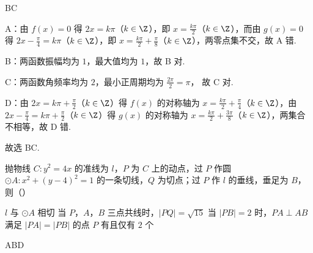 \begin{answer}
BC
\end{answer}

\begin{solution}
A：由 \(f(x)=0\) 得 \(2x=k\pi\)（\(k\in\Z\)），即 \(x=\frac{k\pi}{2}\)（\(k\in\Z\)），而由 \(g(x)=0\) 得 \(2x-\frac{\pi}{4}=k\pi\)（\(k\in\Z\)），即 \(x=\frac{k\pi}{2}+\frac{\pi}{8}\)（\(k\in\Z\)），两零点集不交，故 A 错.

B：两函数振幅均为 \(1\)，最大值均为 \(1\)，故 B 对.

C：两函数角频率均为 \(2\)，最小正周期均为
\(\frac{2\pi}{2}=\pi\)，
故 C 对.

D：由 \(2x=k\pi+\frac{\pi}{2}\)（\(k\in\Z\)）得 \(f(x)\) 的对称轴为 \(x=\frac{k\pi}{2}+\frac{\pi}{4}\)（\(k\in\Z\)），由 \(2x-\frac{\pi}{4}=k\pi+\frac{\pi}{2}\)（\(k\in\Z\)）得 \(g(x)\) 的对称轴为 \(x=\frac{k\pi}{2}+\frac{3\pi}{8}\)（\(k\in\Z\)），两集合不相等，故 D 错.

故选 BC.
\end{solution}

\begin{problem}
抛物线 \(C:y^2=4x\) 的准线为 \(l\)，\(P\) 为 \(C\) 上的动点，过 \(P\) 作圆 \(\odot A:x^2+(y-4)^2=1\) 的一条切线，\(Q\) 为切点；过 \(P\) 作 \(l\) 的垂线，垂足为 \(B\)，则（\quad）

\choices
    {\(l\) 与 \(\odot A\) 相切}
    {当 \(P\)，\(A\)，\(B\) 三点共线时，\(|PQ|=\sqrt{15}\)}
    {当 \(|PB|=2\) 时，\(PA\perp AB\)}
    {满足 \(|PA|=|PB|\) 的点 \(P\) 有且仅有 \(2\) 个}
\end{problem}

\begin{answer}
ABD
\end{answer}

